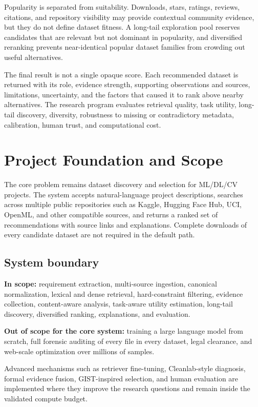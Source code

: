 \documentclass[11pt]{article}
\begin{document}
Popularity is separated from suitability. Downloads, stars, ratings, reviews, citations, and repository
visibility may provide contextual community evidence, but they do not define dataset fitness. A long-tail
exploration pool reserves candidates that are relevant but not dominant in popularity, and diversified
reranking prevents near-identical popular dataset families from crowding out useful alternatives.

The final result is not a single opaque score. Each recommended dataset is returned with its role, evidence
strength, supporting observations and sources, limitations, uncertainty, and the factors that caused it to
rank above nearby alternatives. The research program evaluates retrieval quality, task utility, long-tail
discovery, diversity, robustness to missing or contradictory metadata, calibration, human trust, and
computational cost.

\section{Project Foundation and Scope}
The core problem remains dataset discovery and selection for ML/DL/CV projects. The system accepts
natural-language project descriptions, searches across multiple public repositories such as Kaggle,
Hugging Face Hub, UCI, OpenML, and other compatible sources, and returns a ranked set of recommendations
with source links and explanations. Complete downloads of every candidate dataset are not required in the
default path.

\subsection{System boundary}
\textbf{In scope:} requirement extraction, multi-source ingestion, canonical normalization, lexical and
dense retrieval, hard-constraint filtering, evidence collection, content-aware analysis, task-aware utility
estimation, long-tail discovery, diversified ranking, explanations, and evaluation.

\textbf{Out of scope for the core system:} training a large language model from scratch, full forensic
auditing of every file in every dataset, legal clearance, and web-scale optimization over millions of
samples.

Advanced mechanisms such as retriever fine-tuning, Cleanlab-style diagnosis, formal evidence fusion,
GIST-inspired selection, and human evaluation are implemented where they improve the research questions and
remain inside the validated compute budget.
\end{document}
